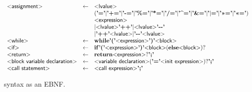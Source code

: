 \begin{figure}
\[\begin{array}{lcl}
  \text{\sf\textless assignment\textgreater} & \gets & \text{\sf\textless lvalue\textgreater}\\&& (\text{\bf'='}
                                                        | \text{\bf'+='}
                                                        | \text{\bf'-='}
                                                        | \text{\bf'\%='}
                                                        | \text{\bf'*='}
                                                        | \text{\bf'/='}
                                                        | \text{\bf'\textasciicircum='}
                                                        | \text{\bf'\&='}
                                                        | \text{\bf'$|$='}
                                                        | \text{\bf'\textgreater\textgreater='}
                                                        | \text{\bf'\textless\textless='})\\&&
                                                         \text{\sf\textless expression\textgreater}\\ & &
                                                      | \text{\sf\textless lvalue\textgreater} \text{\bf'++'}
                                                      | \text{\sf\textless lvalue\textgreater} \text{\bf'{-}{-}'}\\&&
                                  |\text{\bf'++'} \text{\sf\textless lvalue\textgreater}
                                  |\text{\bf'{-}{-}'} \text{\sf\textless lvalue\textgreater}\\

  \text{\sf\textless while\textgreater} & \gets & \mathbf{while} \text{\bf'('} \text{\sf\textless expression\textgreater} \text{\bf')'} \text{\sf\textless block\textgreater}\\

  \text{\sf\textless if\textgreater} & \gets & \mathbf{if} \text{\bf'('} \text{\sf\textless expression\textgreater} \text{\bf')'} \text{\sf\textless block\textgreater}
  (\mathbf{else} \text{\sf\textless block\textgreater})?\\

  \text{\sf\textless return\textgreater} & \gets & \mathbf{return} \text{\sf\textless expression\textgreater}? \text{\bf';'}\\

  \text{\sf\textless block variable declaration\textgreater} & \gets &
  \text{\sf\textless variable declaration\textgreater} (\text{\bf'='} \text{\sf\textless init expression\textgreater})? \text{\bf';'}\\

  \text{\sf\textless call statement\textgreater} & \gets & \text{\sf\textless call expression\textgreater} \text{\bf';'}\\

\end{array}
\]
  \caption {\pencil{} syntax as an EBNF.}
  \label{fig:pencil-syntax}
\end{figure}

